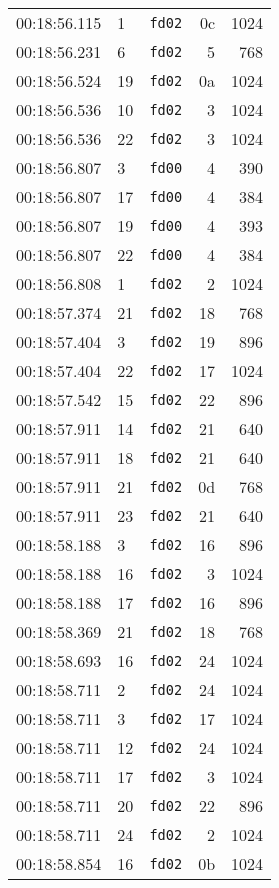 \documentclass{article}
\begin{document}
\begin{longtable}{lllrr}
00:18:56.115 & 1 & \texttt{fd02} & 0c & 1024 \\
00:18:56.231 & 6 & \texttt{fd02} & 5 & 768 \\
00:18:56.524 & 19 & \texttt{fd02} & 0a & 1024 \\
00:18:56.536 & 10 & \texttt{fd02} & 3 & 1024 \\
00:18:56.536 & 22 & \texttt{fd02} & 3 & 1024 \\
00:18:56.807 & 3 & \texttt{fd00} & 4 & 390 \\
00:18:56.807 & 17 & \texttt{fd00} & 4 & 384 \\
00:18:56.807 & 19 & \texttt{fd00} & 4 & 393 \\
00:18:56.807 & 22 & \texttt{fd00} & 4 & 384 \\
00:18:56.808 & 1 & \texttt{fd02} & 2 & 1024 \\
00:18:57.374 & 21 & \texttt{fd02} & 18 & 768 \\
00:18:57.404 & 3 & \texttt{fd02} & 19 & 896 \\
00:18:57.404 & 22 & \texttt{fd02} & 17 & 1024 \\
00:18:57.542 & 15 & \texttt{fd02} & 22 & 896 \\
00:18:57.911 & 14 & \texttt{fd02} & 21 & 640 \\
00:18:57.911 & 18 & \texttt{fd02} & 21 & 640 \\
00:18:57.911 & 21 & \texttt{fd02} & 0d & 768 \\
00:18:57.911 & 23 & \texttt{fd02} & 21 & 640 \\
00:18:58.188 & 3 & \texttt{fd02} & 16 & 896 \\
00:18:58.188 & 16 & \texttt{fd02} & 3 & 1024 \\
00:18:58.188 & 17 & \texttt{fd02} & 16 & 896 \\
00:18:58.369 & 21 & \texttt{fd02} & 18 & 768 \\
00:18:58.693 & 16 & \texttt{fd02} & 24 & 1024 \\
00:18:58.711 & 2 & \texttt{fd02} & 24 & 1024 \\
00:18:58.711 & 3 & \texttt{fd02} & 17 & 1024 \\
00:18:58.711 & 12 & \texttt{fd02} & 24 & 1024 \\
00:18:58.711 & 17 & \texttt{fd02} & 3 & 1024 \\
00:18:58.711 & 20 & \texttt{fd02} & 22 & 896 \\
00:18:58.711 & 24 & \texttt{fd02} & 2 & 1024 \\
00:18:58.854 & 16 & \texttt{fd02} & 0b & 1024 \\

\end{longtable}
\end{document}
